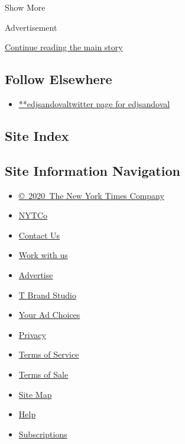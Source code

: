 Show More

Advertisement

\protect\hyperlink{after-mid2}{Continue reading the main story}

\hypertarget{follow-elsewhere}{%
\subsection{Follow Elsewhere}\label{follow-elsewhere}}

\begin{itemize}
\tightlist
\item
  \href{https://twitter.com/edjsandoval}{**edjsandovaltwitter page for
  edjsandoval}
\end{itemize}

\hypertarget{site-index}{%
\subsection{Site Index}\label{site-index}}

\hypertarget{site-information-navigation}{%
\subsection{Site Information
Navigation}\label{site-information-navigation}}

\begin{itemize}
\tightlist
\item
  \href{https://help.nytimes.com/hc/en-us/articles/115014792127-Copyright-notice}{©~2020~The
  New York Times Company}
\end{itemize}

\begin{itemize}
\tightlist
\item
  \href{https://www.nytco.com/}{NYTCo}
\item
  \href{https://help.nytimes.com/hc/en-us/articles/115015385887-Contact-Us}{Contact
  Us}
\item
  \href{https://www.nytco.com/careers/}{Work with us}
\item
  \href{https://nytmediakit.com/}{Advertise}
\item
  \href{http://www.tbrandstudio.com/}{T Brand Studio}
\item
  \href{https://www.nytimes.com/privacy/cookie-policy\#how-do-i-manage-trackers}{Your
  Ad Choices}
\item
  \href{https://www.nytimes.com/privacy}{Privacy}
\item
  \href{https://help.nytimes.com/hc/en-us/articles/115014893428-Terms-of-service}{Terms
  of Service}
\item
  \href{https://help.nytimes.com/hc/en-us/articles/115014893968-Terms-of-sale}{Terms
  of Sale}
\item
  \href{https://spiderbites.nytimes.com}{Site Map}
\item
  \href{https://help.nytimes.com/hc/en-us}{Help}
\item
  \href{https://www.nytimes.com/subscription?campaignId=37WXW}{Subscriptions}
\end{itemize}
